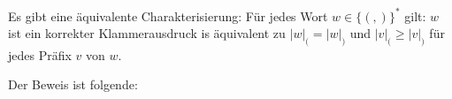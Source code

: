 \documentclass[12pt,a4paper,oneside]{article}
\newcommand{\emptyline}{\hspace*{\fill}}
\begin{document}
\begin{center}
{
                }
            \end{center}

            \newpage

            Es gibt eine äquivalente Charakterisierung:
            Für jedes Wort $w \in \{(, )\}^*$ gilt:
            $w$ ist ein korrekter Klammerausdruck is äquivalent zu $|w|_( = |w|_)$ und $|v|_( \geq |v|_)$ für jedes Präfix $v$ von $w$.

            \emptyline

            Der Beweis ist folgende:

            \emptyline
\end{document}
